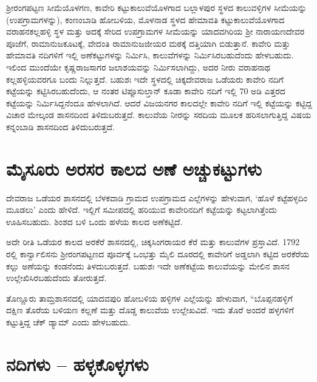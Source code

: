 ಶ‍್ರೀರಂಗಪಟ್ಟಣ ಸೀಮೆಯೊಳಗಣ, ಕಾವೇರಿ ಕಟ್ಟುಕಾಲುವೆಯೊಳಗಾದ ಬಲ್ಲಾಳಪುರ ಸ್ಥಳದ ಕಾಲುವಳ್ಳಿಗಳ ಸೀಮೆ\-ಯನ್ನು (ಉಪಗ್ರಾಮಗಳನ್ನು), ಕಂಣಂಬಾಡಿ ಹೋಬಳಿಯ, ಮೊಳನಾಡ ಸ್ಥಳದ ಹೇಮಾವತಿ ಕಟ್ಟುಕಾಲುವೆಯೊಳಗಾದ ವರಾಹನಕಲ್ಲಹಳ್ಳಿ ಸ್ಥಳ ಮತ್ತು ಅದಕ್ಕೆ ಸೇರಿದ ಉಪಗ್ರಾಮಗಳ ಸೀಮೆಯನ್ನು ಯಾದವಗಿರಿಯ ಶ‍್ರೀ ನಾರಾಯಣದೇವರ ಪೂಜೆಗೆ, ರಾಮಾನುಜಕೂಟಕ್ಕೆ, ವೇದಂತಿ ರಾಮಾನುಜಜೀಯರ ಮಠಕ್ಕೆ ದತ್ತಿಯಾಗಿ ಬಿಡುತ್ತಾನೆ. ಕಾವೇರಿ ಮತ್ತು ಹೇಮಾವತಿ ನದಿಗಳಿಗೆ ಇಲ್ಲಿ ಅಣೆಕಟ್ಟುಗಳನ್ನು ನಿರ್ಮಿಸಿ, ಕಾಲುವೆಗಳನ್ನು ನಿರ್ಮಿಸಿರಬಹುದೆಂದು ಹೇಳಬಹುದು. ಇಲಿಂದ ಮುಂದೆಯೇ ಕೃಷ್ಣರಾಜಸಾಗರ ಜಲಾಶಯವನ್ನು ನಿರ್ಮಿಸಲಾಗಿದ್ದು, ಅದರ ನೀರು ವರಾಹನಾಥ ಕಲ್ಲಹಳ್ಳಿಯವರಗೂ ಬಂದು ನಿಲ್ಲುತ್ತದೆ. ಬಹುಶಃ ಇದೇ ಸ್ಥಳದಲ್ಲಿ ಚಿಕ್ಕದೇವರಾಜ ಒಡೆಯರು ಕಾವೇರಿ ನದಿಗೆ ಕಟ್ಟೆಯನ್ನು ಕಟ್ಟಿಸಿರಬಹುದೆಂದು, ಆ ನಂತರ ಟಿಪ್ಪೂಸುಲ್ತಾನ್​ ಕೂಡಾ ಕಾವೇರಿ ನದಿಗೆ ಇಲ್ಲಿ 70 ಅಡಿ ಎತ್ತರದ ಕಟ್ಟೆಯನ್ನು ನಿರ್ಮಿಸಿದ್ದನೆಂದೂ ಹೇಳಲಾಗಿದೆ. ಆದರೆ ವಿಜಯನಗರ ಕಾಲದಲ್ಲೇ ಕಾವೇರಿ ನದಿಗೆ ಇಲ್ಲಿ ಕಟ್ಟೆಯನ್ನು ಕಟ್ಟಿದ್ದ ವಿಚಾರ ಮೇಲ್ಕಂಡ ಶಾಸನದಿಂದ ತಿಳಿದುಬರುತ್ತದೆ. ಕಾಲುವೆಯ ನೀರನ್ನು ಸರದಿಯ ಮೂಲಕ ಹರಿಸಲಾಗುತ್ತಿದ್ದ ವಿಷಯ ಕನ್ನಂಬಾಡಿ ಶಾಸನದಿಂದ ತಿಳಿದುಬರುತ್ತದೆ.


\section{ಮೈಸೂರು ಅರಸರ ಕಾಲದ ಅಣೆ ಅಚ್ಚುಕಟ್ಟುಗಳು}

ದೇವರಾಜ ಒಡೆಯರ ಶಾಸನದಲ್ಲಿ ಬೆಳಕವಾಡಿ ಗ್ರಾಮದ ಉಪಗ್ರಾಮದ ಎಲ್ಲೆಗಳನ್ನು ಹೇಳುವಾಗ, ‘ಹೊಳೆ ಕಟ್ಟೆಹಳ್ಳದಿಂ ಮೂಡಲು’ ಎಂದು ಹೇಳಿದೆ. ಇಲ್ಲಿಗೆ ಸಮೀಪದಲ್ಲಿ ಹರಿಯುವ ಕಾವೇರಿನದಿಗೆ ಕಟ್ಟೆಯನ್ನು ಕಟ್ಟಲಾಗಿತ್ತೆಂದು ಊಹಿಸಬಹುದು. ಶಿಂಶದ ಬಳಿ ಒಂದು ಹಳೆಯ ಕಾಲದ ಅಣೆಕಟ್ಟಿದೆ.

ಅದೇ ರೀತಿ ಒಡೆಯರ ಕಾಲದ ಅರಕೆರೆ ಶಾಸನದಲ್ಲಿ, ಚಿಕ್ಕಸಿಂಗರಾಯರ ಕೆರೆ ಮತ್ತು ಕಾಲುವೆಗಳ ಪ್ರಸ್ತಾವಿದೆ. 1792 ರಲ್ಲಿ ಕಾರ್ನ್ವಾಲಿಸನು ಶ‍್ರೀರಂಗಪಟ್ಟಣದ ಪೂರ್ವಕ್ಕೆ ಒಂಭತ್ತು ಮೈಲಿ ದೂರದಲ್ಲಿ ಕಾವೇರಿಗೆ ಅಡ್ಡಲಾಗಿ ಕಟ್ಟಿದ ಅರಕೆರೆಯ ಕಲ್ಲು ಅಣೆಯನ್ನು ಕಂಡನೆಂದು ತಿಳದುಬರುತ್ತದೆ. ಬಹುಶಃ ಇದೇ ಅಣೆಕಟ್ಟೆಯ ಕಾಲುವೆಯನ್ನು ಮೇಲಿನ ಶಾಸನ ಉಲ್ಲೇಖಿಸಿರಬಹುದೆಂದು ತೋರುತ್ತದೆ.

ತೊಣ್ಣೂರು ತಾಮ್ರಶಾಸನದಲ್ಲಿ ಯಾದವಪುರಿ ಹೋಬಳಿಯ ಹಳ್ಳಿಗಳ ಎಲ್ಲೆಯನ್ನು ಹೇಳುವಾಗ, “ಬೊಪ್ಪನಹಳ್ಳಿಗೆ ದಕ್ಷಿಣ ತೊರೆಯ ಬಳಿಯಣ ಕಲ್ಲಣೆ ಮತ್ತು ದೊಡ್ಡ ಕಾಲುವೆಯ ಉಲ್ಲೇಖವಿದೆ. ಇದು ತೊರೆ ಅಂದರೆ ಹಳ್ಳಗಳಿಗೆ ಕಟ್ಟುತ್ತಿದ್ದ ಚೆಕ್​ ಡ್ಯಾಮ್ ಎಂದು ಹೇಳಬಹುದು.


\section{ನದಿಗಳು – ಹಳ್ಳಕೊಳ್ಳಗಳು}

